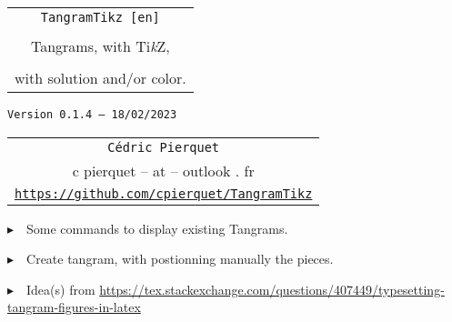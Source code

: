 \documentclass{article}
\def\TPversion{0.1.4}
\def\TPdate{18/02/2023}
\begin{document}
\pagestyle{fancy}

\thispagestyle{empty}

\vspace{2cm}

\begin{center}
	\begin{minipage}{0.75\linewidth}
	\begin{tcolorbox}[colframe=yellow,colback=yellow!15]
		\begin{center}
			\begin{tabular}{c}
				{\Huge \texttt{TangramTikz [en]}}\\
				\\
				{\LARGE Tangrams, with Ti\textit{k}Z}, \\
				\\
				{\LARGE with solution and/or color.} \\
			\end{tabular}
			
			\medskip
			
			{\small \texttt{Version \TPversion{} -- \TPdate}}
		\end{center}
	\end{tcolorbox}
\end{minipage}
\end{center}

\vspace{0.5cm}

\begin{center}
	\begin{tabular}{c}
	\texttt{Cédric Pierquet}\\
	{\ttfamily c pierquet -- at -- outlook . fr}\\
	\texttt{\url{https://github.com/cpierquet/TangramTikz}}
\end{tabular}
\end{center}

\vspace{0.5cm}

{$\blacktriangleright$~~Some commands to display existing Tangrams.}

\smallskip

{$\blacktriangleright$~~Create tangram, with postionning manually the pieces.}

\smallskip

{$\blacktriangleright$~~Idea(s) from \url{https://tex.stackexchange.com/questions/407449/typesetting-tangram-figures-in-latex}}

\vspace{1cm}
\end{document}
